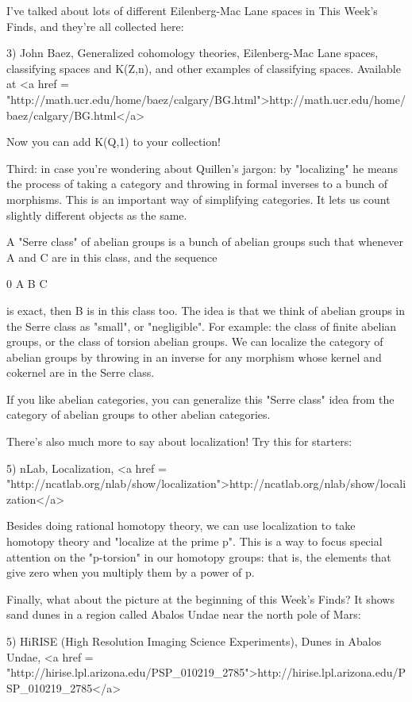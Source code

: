 I've talked about lots of different Eilenberg-Mac Lane spaces in 
This Week's Finds, and they're all collected here:

3) John Baez, Generalized cohomology theories, Eilenberg-Mac Lane
spaces, classifying spaces and K(Z,n), and other examples of
classifying spaces.  Available at
<a href = "http://math.ucr.edu/home/baez/calgary/BG.html">http://math.ucr.edu/home/baez/calgary/BG.html</a>

Now you can add K(Q,1) to your collection!

Third: in case you're wondering about Quillen's jargon: by
"localizing" he means the process of taking a category and throwing in
formal inverses to a bunch of morphisms.  This is an important way of
simplifying categories.  It lets us count slightly different objects
as the same.  

A "Serre class" of abelian groups is a bunch of abelian groups such
that whenever A and C are in this class, and the sequence

0 \to  A \to  B \to  C 

is exact, then B is in this class too.  The idea is that we think of
abelian groups in the Serre class as "small", or "negligible".  For
example: the class of finite abelian groups, or the class of torsion
abelian groups.  We can localize the category of abelian groups by
throwing in an inverse for any morphism whose kernel and cokernel are
in the Serre class.

If you like abelian categories, you can generalize this "Serre
class" idea from the category of abelian groups to other abelian
categories.  

There's also much more to say about localization!  Try this for
starters:
 
5) nLab, Localization, <a href = "http://ncatlab.org/nlab/show/localization">http://ncatlab.org/nlab/show/localization</a>

Besides doing rational homotopy theory, we can use localization to
take homotopy theory and "localize at the prime p".  This is a way to
focus special attention on the "p-torsion" in our homotopy groups:
that is, the elements that give zero when you multiply them by a power
of p.

Finally, what about the picture at the beginning of this Week's Finds?
It shows sand dunes in a region called Abalos Undae near the north
pole of Mars:

5) HiRISE (High Resolution Imaging Science Experiments), 
Dunes in Abalos Undae, <a href = "http://hirise.lpl.arizona.edu/PSP_010219_2785">http://hirise.lpl.arizona.edu/PSP_010219_2785</a>

